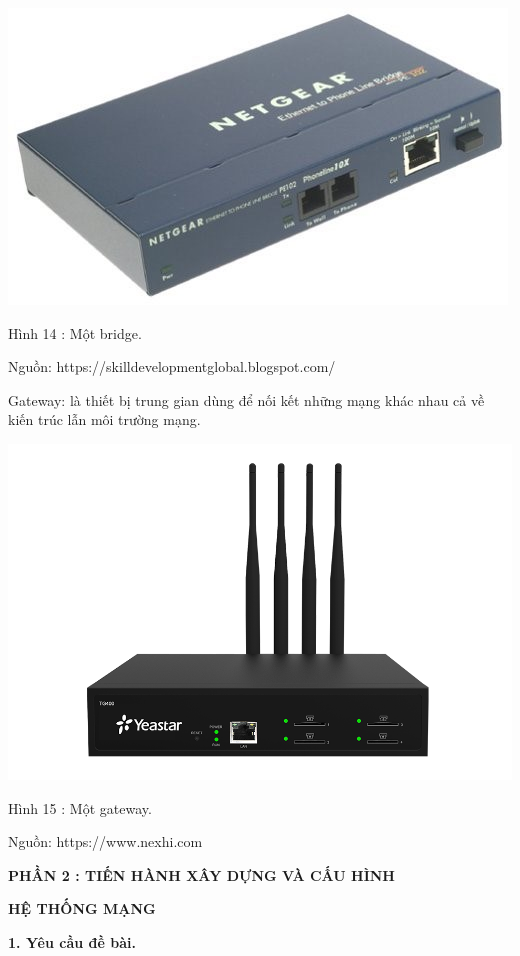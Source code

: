 \documentclass{report}
\begin{document}
\begin{center}
     \includegraphics[scale=0.45]{bridge}
\end{center}
\centerline{Hình 14 : Một bridge.}
\changefontsizes{12pt}
\centerline{Nguồn: https://skilldevelopmentglobal.blogspot.com/}
\changefontsizes{13pt}
\bigskip


Gateway: là thiết bị trung gian dùng để nối kết những mạng khác nhau cả về kiến trúc lẫn môi trường mạng.

\begin{center}
     \includegraphics[scale=0.3]{gateway}
\end{center}
\centerline{Hình 15 : Một gateway.}
\changefontsizes{12pt}
\centerline{Nguồn: https://www.nexhi.com}
\changefontsizes{13pt}
\bigskip


\newpage
\changefontsizes{16pt}
\centerline{\textbf{PHẦN 2 : TIẾN HÀNH XÂY DỰNG VÀ CẤU HÌNH}}
\centerline{\textbf{HỆ THỐNG MẠNG}}

\bigskip
\changefontsizes{14pt}
\textbf{1.	Yêu cầu đề bài.}
\changefontsizes{13pt}
\end{document}
